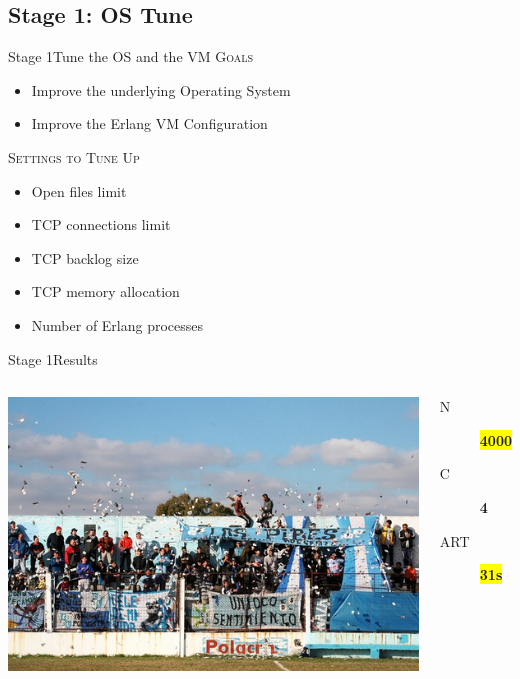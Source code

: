 \documentclass[utf8,hyperref={colorlinks=true}]{beamer}
\begin{document}
\subsection{Stage 1: OS Tune}
\begin{frame}{Stage 1}{Tune the OS and the VM}
	\textsc{Goals}
	\begin{itemize}
		\item Improve the underlying Operating System
		\item Improve the Erlang VM Configuration
	\end{itemize}
	\pause
	\textsc{Settings to Tune Up}
	\begin{itemize}
		\item Open files limit
		\item TCP connections limit
		\item TCP backlog size
		\item TCP memory allocation
		\item Number of Erlang processes
	\end{itemize}
\end{frame}
\begin{frame}{Stage 1}{Results}
	\begin{columns}
			\includegraphics[top=-1,width=\textwidth]{img/results-2.jpg}
			\begin{description}
				\item[N] \textbf{\colorbox{yellow}{\Large 4000}}
				\item[C] \textbf{\color{red}\Large 4}
				\item[ART] \textbf{\colorbox{yellow}{\color{red}\Large 31s}}
			\end{description}
	\end{columns}
\end{frame}
\end{document}
